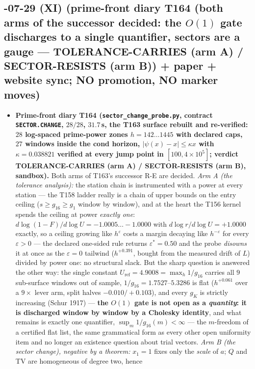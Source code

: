 \documentclass[11pt]{article}
\begin{document}
\subsection*{-07-29 (XI) (prime-front diary T164 (both arms of the successor decided: the $O(1)$ gate discharges to a single quantifier, sectors are a gauge --- TOLERANCE-CARRIES (arm A) / SECTOR-RESISTS (arm B)) + paper + website sync; NO promotion, NO marker moves)}
\begin{itemize}[leftmargin=1.5em]
\item \textbf{Prime-front diary T164 (\texttt{sector\_change\_probe.py}, contract
\texttt{SECTOR.CHANGE}, $28/28$, $31.7$\,s, the T163 surface rebuilt and
re-verified: $28$ log-spaced prime-power zones $h=142\ldots1445$ with declared
caps, $27$ windows inside the cond horizon, $|\psi(x)-x|\le\kappa x$ with
$\kappa=0.038821$ verified at every jump point in $[100,4\times10^{5}]$; verdict
TOLERANCE-CARRIES (arm A) / SECTOR-RESISTS (arm B), sandbox).} Both arms of
T163's successor R-E are decided. \emph{Arm A (the tolerance analysis):} the
station chain is instrumented with a power at every station --- the T158 ladder
really is a chain of upper bounds on the entry ceiling ($s\ge g_{16}\ge g_1$
window by window), and at the heart the T156 kernel spends the ceiling at power
\emph{exactly one}: $d\log(1-F)/d\log U=-1.0005\ldots-1.0000$ with
$d\log r/d\log U=+1.0000$ exactly, so a ceiling growing like $h^{\varepsilon}$
costs a margin decaying like $h^{-\varepsilon}$ for every $\varepsilon>0$ ---
the declared one-sided rule returns $\varepsilon^*=0.50$ and the probe
\emph{disowns} it at once as the $\varepsilon=0$ tailwind ($h^{+0.391}$, bought
from the measured drift of $L$) divided by power one: no structural slack. But
the sharp question is answered the other way: the single constant
$U_{\mathrm{ref}}=4.9008=\max_h 1/g_{16}$ carries all $9$ sub-surface windows
out of sample, $1/g_{16}=1.7527$--$5.3286$ is flat ($h^{+0.061}$ over a
$9\times$ lever arm, split halves $-0.010/+0.103$), and every $g_K$ is strictly
increasing (Schur 1917) --- \textbf{the $O(1)$ gate is not open as a
\emph{quantity}: it is discharged window by window by a Cholesky identity},
and what remains is exactly one quantifier, $\sup_m 1/g_{16}(m)<\infty$ --- the
$m$-freedom of a certified flat list, the same grammatical form as every other
open uniformity item and no longer an existence question about trial vectors.
\emph{Arm B (the sector change), negative by a theorem:} $x_1=1$ fixes only the
\emph{scale} of $a$; $Q$ and TV are homogeneous of degree two, hence

\end{itemize}
\end{document}
